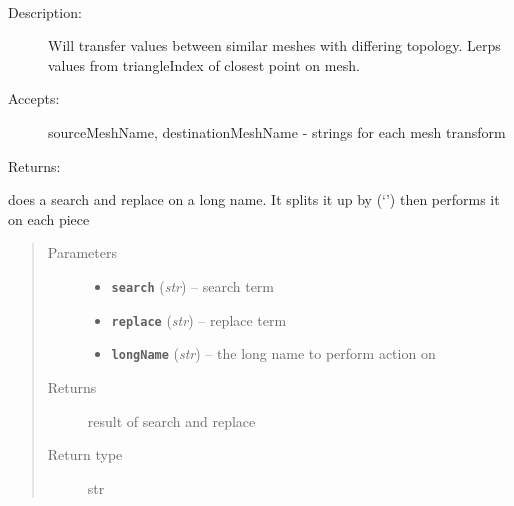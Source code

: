 \documentclass[letterpaper,10pt,english]{sphinxmanual}
\begin{document}
\begin{fulllineitems}
\label{zBuilder.data:zBuilder.data.map.interpolateValues}~\begin{description}
\item[{Description:}] \leavevmode
Will transfer values between similar meshes with differing topology.
Lerps values from triangleIndex of closest point on mesh.

\item[{Accepts:}] \leavevmode
sourceMeshName, destinationMeshName - strings for each mesh transform

\end{description}

Returns:

\end{fulllineitems}


\begin{fulllineitems}
\label{zBuilder.data:zBuilder.data.map.replace_longname}
does a search and replace on a long name.  It splits it up by (`\textbar{}') then
performs it on each piece
\begin{quote}\begin{description}
\item[{Parameters}] \leavevmode\begin{itemize}
\item {} 
\textbf{\texttt{search}} (\emph{str}) -- search term

\item {} 
\textbf{\texttt{replace}} (\emph{str}) -- replace term

\item {} 
\textbf{\texttt{longName}} (\emph{str}) -- the long name to perform action on

\end{itemize}

\item[{Returns}] \leavevmode
result of search and replace

\item[{Return type}] \leavevmode
str

\end{description}\end{quote}

\end{fulllineitems}
\end{document}
